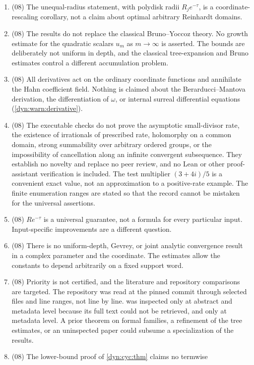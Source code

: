 \documentclass[11pt,letterpaper]{article}
\theoremstyle{definition}
\theoremstyle{remark}
\newcommand{\No}{\mathbf{No}}
\numberwithin{equation}{section}
\begin{document}
\begin{enumerate}[label=\textbf{N\arabic*.},ref=\textbf{N\arabic*},leftmargin=3.2em,start=81]
of $\No[i]$ is constructed.
\item (08) The unequal-radius statement, with polydisk radii $R_je^{-\tau}$,
is a coordinate-rescaling corollary, not a claim about optimal arbitrary
Reinhardt domains.
\item (08) The results do not replace the classical Bruno--Yoccoz theory.
No growth estimate for the quadratic scalars $u_m$ as $m\to\infty$ is
asserted. The bounds are deliberately not uniform in depth, and the
classical tree-expansion and Bruno estimates control a different
accumulation problem.
\item (08) All derivatives act on the ordinary coordinate functions and
annihilate the Hahn coefficient field. Nothing is claimed about the
Berarducci--Mantova derivation, the differentiation of $\omega$, or internal
surreal differential equations (\cref{dyn:warn:derivative}).
\item (08) The executable checks do not prove the asymptotic small-divisor
rate, the existence of irrationals of prescribed rate, holomorphy on a
common domain, strong summability over arbitrary ordered groups, or the
impossibility of cancellation along an infinite convergent subsequence.
They establish no novelty and replace no peer review, and no Lean or other
proof-assistant verification is included. The test multiplier $(3+4i)/5$ is
a convenient exact value, not an approximation to a positive-rate example.
The finite enumeration ranges are stated so that the record cannot be
mistaken for the universal assertions.
\item (08) $Re^{-\tau}$ is a universal guarantee, not a formula for every
particular input. Input-specific improvements are a different question.
\item (08) There is no uniform-depth, Gevrey, or joint analytic convergence
result in a complex parameter and the coordinate. The estimates allow the
constants to depend arbitrarily on a fixed support word.
\item\label{dyn:esm:nc:priority08} (08) Priority is not certified, and the
literature and repository comparisons are targeted. The repository was read
at the pinned commit through selected files and line ranges, not line by
line. \cite{FauvetMenousSauzin} was inspected only at abstract and metadata
level because its full text could not be retrieved, and \cite{Yoccoz} only
at metadata level. A prior theorem on formal families, a refinement of the
tree estimates, or an uninspected paper could subsume a specialization of
the results.
\item (08) The lower-bound proof of \cref{dyn:cyc:thm} claims no termwise

\end{enumerate}
\end{document}
